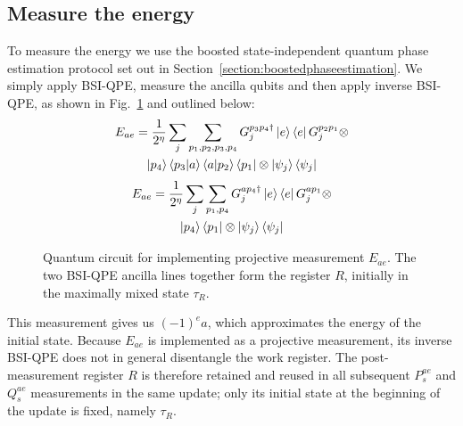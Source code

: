 \documentclass[aps,floatfix,10pt,amssymb,amsfont,amsmath,superscriptaddress,float,nofootinbib,longbibliography,nobalancelastpage,twocolumn]{revtex4-2}
\begin{document}
\subsection{Measure the energy}
\label{section:energymeasurement}
To measure the energy we use the boosted state-independent quantum phase estimation protocol set out in Section~\ref{section:boostedphaseestimation}. We simply apply BSI-QPE, measure the ancilla qubits and then apply inverse BSI-QPE, as shown in Fig.~\ref{fig:Ecircuit} and outlined below:
\begin{multline}
    E_{ae} = \frac{1}{2^{\eta}}\sum_j\sum_{p_1,p_2,p_3,p_4} G_j^{p_3p_4 \dagger}\ket{e}\bra{e}G_j^{p_2p_1}\otimes\\\ket{p_4}\braket{p_3|a}\braket{a|p_2}\bra{p_1}\otimes\ket{\psi_j}\bra{\psi_j}
\end{multline}
\begin{multline}
        E_{ae} = \frac{1}{2^{\eta}}\sum_j\sum_{p_1,p_4} G_j^{ap_4 \dagger}\ket{e}\bra{e}G_j^{ap_1}\otimes\\\ket{p_4}\bra{p_1}\otimes\ket{\psi_j}\bra{\psi_j}
\end{multline}
\begin{figure}

\caption{Quantum circuit for implementing projective measurement $E_{ae}$. The two BSI-QPE ancilla lines together form the register $R$, initially in the maximally mixed state $\tau_R$.}
\label{fig:Ecircuit}
\end{figure}
This measurement gives us $(-1)^ea$, which approximates the energy of the initial state. Because $E_{ae}$ is implemented as a projective measurement, its inverse BSI-QPE does not in general disentangle the work register. The post-measurement register $R$ is therefore retained and reused in all subsequent $P_s^{ae}$ and $Q_s^{ae}$ measurements in the same update; only its initial state at the beginning of the update is fixed, namely $\tau_R$.
\end{document}
